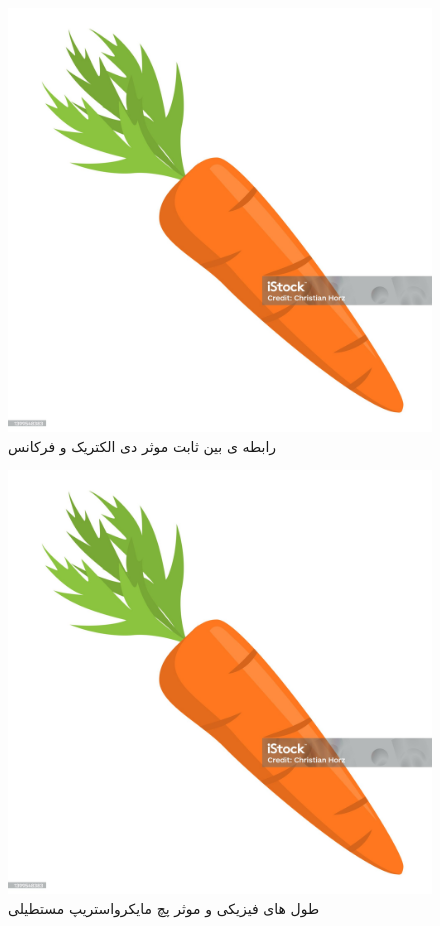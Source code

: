 \begin{figure}
	\centering
	\includegraphics[scale=0.3]{Images/aaa.jpg}
	\caption{رابطه ی بین ثابت موثر دی الکتریک و فرکانس}
	\label{fig10}
\end{figure}

\begin{figure}
	\centering
	\includegraphics[scale=0.3]{Images/aaa.jpg}
	\caption{طول های فیزیکی و موثر پچ مایکرواستریپ مستطیلی}
	\label{fig11}
\end{figure}

